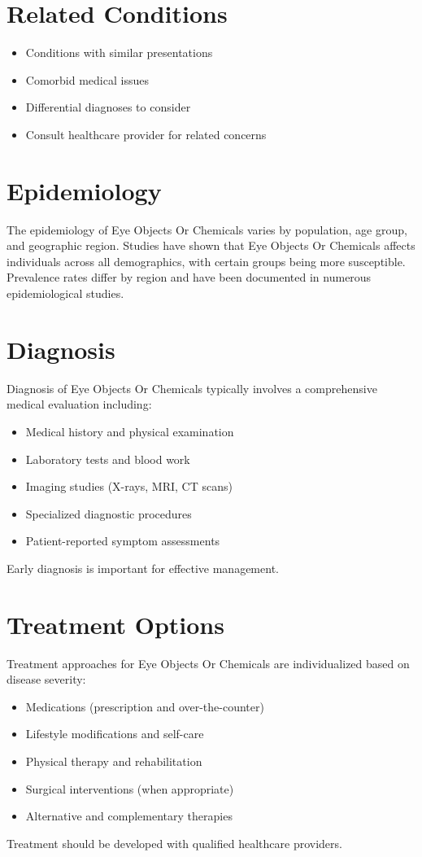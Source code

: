 \section*{Related Conditions}
\begin{itemize}
  \item Conditions with similar presentations
  \item Comorbid medical issues
  \item Differential diagnoses to consider
  \item Consult healthcare provider for related concerns
\end{itemize}

\section*{Epidemiology}
The epidemiology of Eye Objects Or Chemicals varies by population, age group, and geographic region. Studies have shown that Eye Objects Or Chemicals affects individuals across all demographics, with certain groups being more susceptible. Prevalence rates differ by region and have been documented in numerous epidemiological studies.

\section*{Diagnosis}
Diagnosis of Eye Objects Or Chemicals typically involves a comprehensive medical evaluation including:
\begin{itemize}
  \item Medical history and physical examination
  \item Laboratory tests and blood work
  \item Imaging studies (X-rays, MRI, CT scans)
  \item Specialized diagnostic procedures
  \item Patient-reported symptom assessments
\end{itemize}
Early diagnosis is important for effective management.

\section*{Treatment Options}
Treatment approaches for Eye Objects Or Chemicals are individualized based on disease severity:
\begin{itemize}
  \item Medications (prescription and over-the-counter)
  \item Lifestyle modifications and self-care
  \item Physical therapy and rehabilitation
  \item Surgical interventions (when appropriate)
  \item Alternative and complementary therapies
\end{itemize}
Treatment should be developed with qualified healthcare providers.

